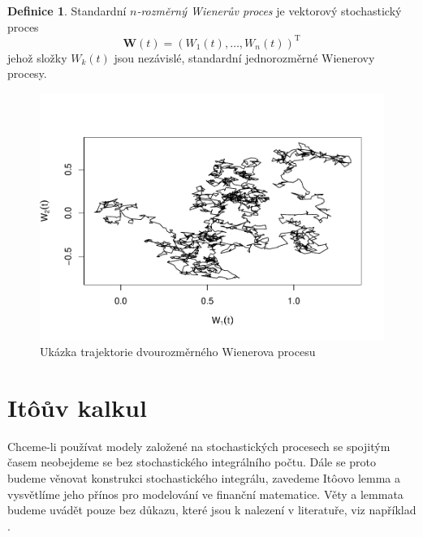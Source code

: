 \documentclass[a4paper,12pt]{report}
\theoremstyle{definition} \newtheorem{definice}[veta]{Definice}
\theoremstyle{remark}
\begin{document}
\begin{definice}
Standardní \textit{$n$-rozměrný Wienerův proces} je vektorový stochastický proces
$$\boldsymbol{W}(t) = (W_1(t), \dots, W_n(t))^\mathrm{T}$$
jehož složky $W_k(t)$ jsou nezávislé, standardní jednorozměrné Wienerovy procesy.
\end{definice}

\begin{figure}[!htbp]
  \centering 
	\includegraphics[width=13.5cm, clip, trim= 0 20 25 50]{IMG/WP_2D_v6.pdf}
  \caption{Ukázka trajektorie dvourozměrného Wienerova procesu}  \label{WP_2D_graf}
\end{figure}


\section{It\^oův kalkul}\label{Ito_kalkul}
Chceme-li používat modely založené na stochastických procesech se spojitým časem neobejdeme se bez stochastického integrálního počtu.
Dále se proto budeme věnovat konstrukci stochastického integrálu, zavedeme It\^oovo lemma a vysvětlíme jeho přínos pro modelování ve finanční matematice.
Věty a lemmata budeme uvádět pouze bez důkazu, které jsou k nalezení v literatuře, viz například \cite{karatzas2012brownian}.
\end{document}
